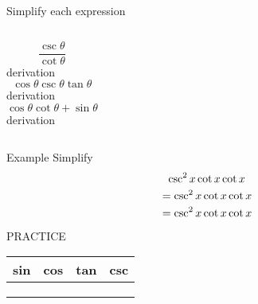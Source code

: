 \documentclass{beamer}
\begin{document}
\begin{frame}{Simplify each expression}
    \begin{columns}
        \[
    \frac{\csc{\theta}}{\cot{\theta}}
        \]
         derivation
        \[
    \cos{\theta} \csc{\theta} \tan{\theta}
        \]
         derivation
        \[
    \cos{\theta} \cot{\theta} + \sin{\theta}
        \]
         derivation
    \end{columns}
\end{frame}

\begin{frame}{Example}
Simplify
\[ 
    \csc^2{x} \cot{x} \- \cot{x} \]
    \[
      = \csc^2{x} \cot{x} \- \cot{x}
     \]
    \[
      = \csc^2{x} \cot{x} \- \cot{x}
     \]

    
\end{frame}

\begin{frame}{PRACTICE}
\begin{tabular}{|c|c|c|c|}
\hline
    sin & cos & tan & csc \\
     \hline
     & & &  \\
     \hline
     & & &  \\
     \hline
     & & &  \\
     \hline
      
\end{tabular}
    
\end{frame}
\end{document}
